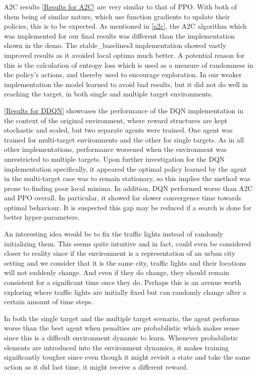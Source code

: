 \documentclass{article}
\begin{document}
	A2C results \ref{Results for A2C} are very similar to that of PPO. With both of them being of similar nature, which use function gradients to update their policies, this is to be expected. As mentioned in \ref{a2c}, the A2C algorithm which was implemented for our final results was different than the implementation shown in the demo. The stable\_baselines3 implementation showed vastly improved results as it avoided local optima much better. A potential reason for this is the calculation of entropy loss which is used as a measure of randomness in the policy's actions, and thereby used to encourage exploration. In our weaker implementation the model learned to avoid bad results, but it did not do well in reaching the target, in both single and multiple target environments.    
	
	\ref{Results for DDQN} showcases the performance of the DQN implementation in the context of the original environment, where reward structures are kept stochastic and scaled, but two separate agents were trained. One agent was trained for multi-target environments and the other for single targets. As in all other implementations, performance worsened when the environment was unrestricted to multiple targets. Upon further investigation for the DQN implementation specifically, it appeared the optimal policy learned by the agent in the multi-target case was to remain stationary, so this implies the method was prone to finding poor local minima. In addition, DQN performed worse than A2C and PPO overall. In particular, it showed far slower convergence time towards optimal behaviour. It is suspected this gap may be reduced if a search is done for better hyper-parameters.
	
	An interesting idea would be to fix the traffic lights instead of randomly initializing them. This seems quite intuitive and in fact, could even be considered closer to reality since if the environment is a representation of an urban city setting and we consider that it is the same city, traffic lights and their locations will not suddenly change. And even if they do change, they should remain consistent for a significant time once they do. Perhaps this is an avenue worth exploring where traffic lights are initially fixed but can randomly change after a certain amount of time steps. 
	
	In both the single target and the multiple target scenario, the agent performs worse than the best agent when penalties are probabilistic which makes sense since this is a difficult environment dynamic to learn. Whenever probabilistic elements are introduced into the environment dynamics, it makes training significantly tougher since even though it might revisit a state and take the same action as it did last time, it might receive a different reward.
	
\end{document}
